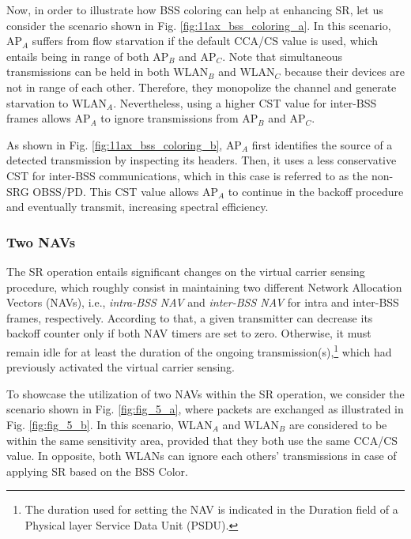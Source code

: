 \documentclass[comsoc]{IEEEtran}
\begin{document}
	Now, in order to illustrate how BSS coloring can help at enhancing SR, let us consider the scenario shown in Fig. \ref{fig:11ax_bss_coloring_a}. In this scenario, $\text{AP}_{A}$ suffers from flow starvation if the default CCA/CS value is used, which entails being in range of both $\text{AP}_B$ and $\text{AP}_C$. Note that simultaneous transmissions can be held in both $\text{WLAN}_B$ and $\text{WLAN}_C$ because their devices are not in range of each other. Therefore, they monopolize the channel and generate starvation to $\text{WLAN}_A$. Nevertheless, using a higher CST value for inter-BSS frames allows $\text{AP}_{A}$ to ignore transmissions from $\text{AP}_B$ and $\text{AP}_C$. 
	
	As shown in Fig. \ref{fig:11ax_bss_coloring_b}, $\text{AP}_A$ first identifies the source of a detected transmission by inspecting its headers. Then, it uses a less conservative CST for inter-BSS communications, which in this case is referred to as the non-SRG OBSS/PD. This CST value allows $\text{AP}_A$ to continue in the backoff procedure and eventually transmit, increasing spectral efficiency.
	
	\subsubsection{Two NAVs}
	\label{section:two_navs}
	The SR operation entails significant changes on the virtual carrier sensing procedure, which roughly consist in maintaining two different Network Allocation Vectors (NAVs), i.e., \emph{intra-BSS NAV} and \emph{inter-BSS NAV} for intra and inter-BSS frames, respectively. According to that, a given transmitter can decrease its backoff counter only if both NAV timers are set to zero. Otherwise, it must remain idle for at least the duration of the ongoing transmission(s),\footnote{The duration used for setting the NAV is indicated in the Duration field of a Physical layer Service Data Unit (PSDU).} which had previously activated the virtual carrier sensing. 
	
	To showcase the utilization of two NAVs within the SR operation, we consider the scenario shown in Fig. \ref{fig:fig_5_a}, where packets are exchanged as illustrated in Fig. \ref{fig:fig_5_b}. In this scenario, $\text{WLAN}_A$ and $\text{WLAN}_B$ are considered to be within the same sensitivity area, provided that they both use the same CCA/CS value. In opposite, both WLANs can ignore each others' transmissions in case of applying SR based on the BSS Color.
	
\end{document}
